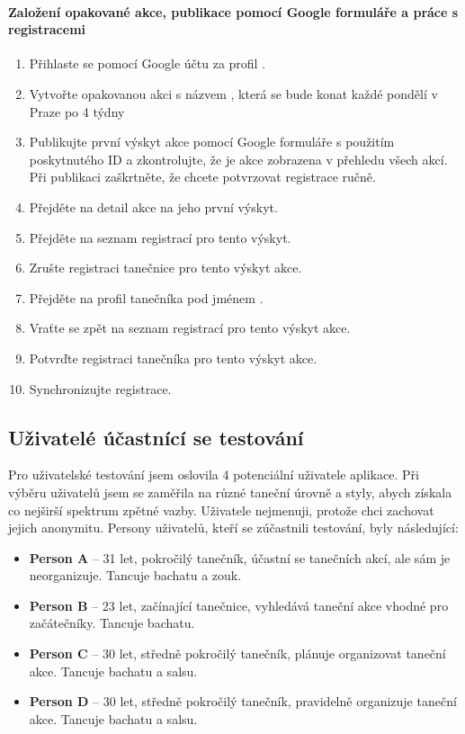 \paragraph*{Založení opakované akce, publikace pomocí Google formuláře a práce s registracemi}
\begin{enumerate}
    \item Přihlaste se pomocí Google účtu za profil .
    \item Vytvořte opakovanou akci s názvem , která se bude konat každé pondělí v Praze po 4 týdny
    \item Publikujte první výskyt akce pomocí Google formuláře s použitím poskytnutého ID a zkontrolujte, že je akce zobrazena v přehledu všech akcí. Při publikaci zaškrtněte, že chcete potvrzovat registrace ručně.
    \item Přejděte na detail akce  na jeho první výskyt. 
    \item Přejděte na seznam registrací pro tento výskyt.
    \item Zrušte registraci tanečnice  pro tento výskyt akce.
    \item Přejděte na profil tanečníka pod jménem .
    \item Vraťte se zpět na seznam registrací pro tento výskyt akce. 
    \item Potvrďte registraci tanečníka  pro tento výskyt akce.
    \item Synchronizujte registrace.
\end{enumerate}
\subsection{Uživatelé účastnící se testování}
Pro uživatelské testování jsem oslovila 4 potenciální uživatele aplikace. Při výběru uživatelů jsem se zaměřila na různé taneční úrovně a styly, abych získala co nejširší spektrum zpětné vazby. Uživatele nejmenuji, protože chci zachovat jejich anonymitu. Persony uživatelů, kteří se zúčastnili testování, byly následující:
\begin{itemize}
    \item \textbf{Person A} – 31 let, pokročilý tanečník, účastní se tanečních akcí, ale sám je neorganizuje. Tancuje bachatu a zouk.
    \item \textbf{Person B} – 23 let, začínající tanečnice, vyhledává taneční akce vhodné pro začátečníky. Tancuje bachatu.
    \item \textbf{Person C} – 30 let, středně pokročilý tanečník, plánuje organizovat taneční akce. Tancuje bachatu a salsu.
    \item \textbf{Person D} – 30 let, středně pokročilý tanečník, pravidelně organizuje taneční akce. Tancuje bachatu a salsu.
\end{itemize}


